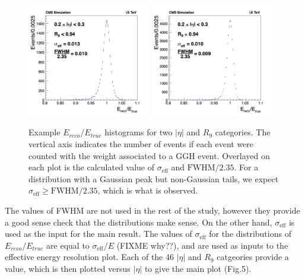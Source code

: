 \documentclass[10pt]{article}
\begin{document}
\begin{figure}[h!]

  \centering
\includegraphics[width=0.48\textwidth]{"Hist2_mva"}
\includegraphics[width=0.48\textwidth]{"Hist25_mva"}
\caption{Example $E_{reco}/E_{true} $ histograms for two $|\eta|$ and $R_{9}$ categories. The vertical axis indicates the number of events if each event were counted with the weight associated to a GGH event. Overlayed on each plot is the calculated value of  $\sigma_{\text{eff}}$ and $\text{FWHM}/2.35$. For a distribution with a Gaussian peak but non-Gaussian tails, we expect $\sigma_{\text{eff}} \geq \text{FWHM}/2.35$, which is what is observed.}
\end{figure}

The values of FWHM are not used in the rest of the study, however they provide a good sense check that the distributions make sense. On the other hand, $\sigma_{\text{eff}}$ is used as the input for the main result. The values of $\sigma_{\text{eff}}$ for the distributions of  $E_{reco}/E_{true}$ are equal to $\sigma_{\text{eff}}/E$ (FIXME why??), and are used as inputs to the effective energy resolution plot. Each of the 46 $|\eta|$ and $R_{9}$ catgeories provide a value, which is then plotted versus $|\eta|$ to give the main plot (Fig.5).
\end{document}
